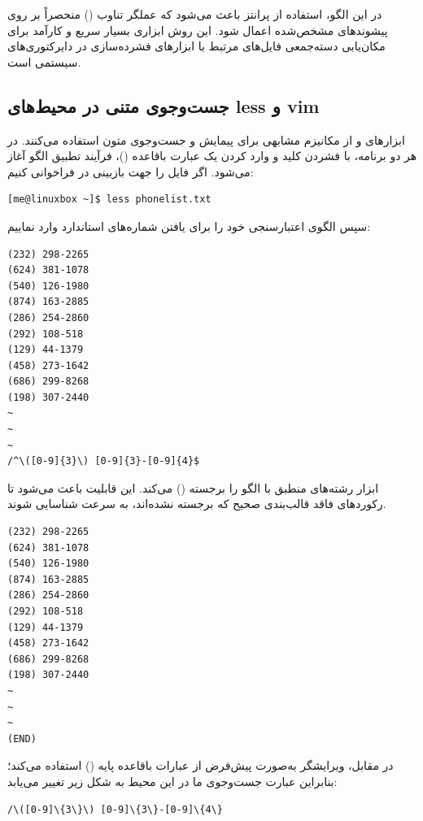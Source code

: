 در این الگو، استفاده از پرانتز باعث می‌شود که عملگر تناوب (\cmd{|}) منحصراً بر روی پیشوندهای مشخص‌شده اعمال شود. این روش ابزاری بسیار سریع و کارآمد برای مکان‌یابی دسته‌جمعی فایل‌های مرتبط با ابزارهای فشرده‌سازی در دایرکتوری‌های سیستمی است.

\subsection{جست‌وجوی متنی در محیط‌های less و vim}

ابزارهای  و  از مکانیزم مشابهی برای پیمایش و جست‌وجوی متون استفاده می‌کنند. در هر دو برنامه، با فشردن کلید \cmd{/} و وارد کردن یک عبارت باقاعده ()، فرآیند تطبیق الگو آغاز می‌شود. اگر فایل  را جهت بازبینی در  فراخوانی کنیم:

\begin{latin}
\begin{lstlisting}
[me@linuxbox ~]$ less phonelist.txt
\end{lstlisting}
\end{latin}

سپس الگوی اعتبارسنجی خود را برای یافتن شماره‌های استاندارد وارد نماییم:

\begin{latin}
\begin{lstlisting}
(232) 298-2265
(624) 381-1078
(540) 126-1980
(874) 163-2885
(286) 254-2860
(292) 108-518
(129) 44-1379
(458) 273-1642
(686) 299-8268
(198) 307-2440
~
~
~
/^\([0-9]{3}\) [0-9]{3}-[0-9]{4}$
\end{lstlisting}
\end{latin}

ابزار  رشته‌های منطبق با الگو را برجسته () می‌کند. این قابلیت باعث می‌شود تا رکوردهای فاقد قالب‌بندی صحیح که برجسته نشده‌اند، به سرعت شناسایی شوند.

\begin{latin}
\begin{lstlisting}
(232) 298-2265
(624) 381-1078
(540) 126-1980
(874) 163-2885
(286) 254-2860
(292) 108-518
(129) 44-1379
(458) 273-1642
(686) 299-8268
(198) 307-2440
~
~
~
(END)
\end{lstlisting}
\end{latin}

در مقابل، ویرایشگر  به‌صورت پیش‌فرض از عبارات باقاعده پایه () استفاده می‌کند؛ بنابراین عبارت جست‌وجوی ما در این محیط به شکل زیر تغییر می‌یابد:

\begin{latin}
\begin{lstlisting}
/\([0-9]\{3\}\) [0-9]\{3\}-[0-9]\{4\}
\end{lstlisting}
\end{latin}

